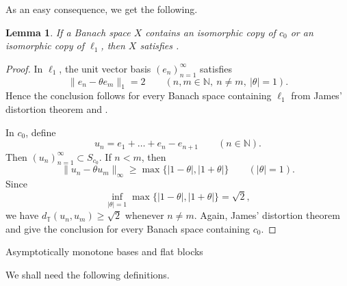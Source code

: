\documentclass[11pt,reqno]{amsart}
\makeatletter
\theoremstyle{plain}
\newtheorem{lemma}[lemma]{Lemma}
\theoremstyle{definition}
\newcommand{\N}{\mathbb N}
\newcommand{\distT}{d_{\mathbb T}}
\newcounter{problempaper}
\newenvironment{problempaperbody}{%
  \setcounter{subsection}{0}%
  \setcounter{subsubsection}{0}%
  \setcounter{paragraph}{0}%
  \renewcommand{\thesubsection}{\arabic{subsection}}%
  \renewcommand{\thesubsubsection}{\thesubsection.\arabic{subsubsection}}%
  \renewcommand{\theparagraph}{\thesubsubsection.\arabic{paragraph}}%
  \let\problem@outersection\section
  \let\problem@outersubsection\subsection
  \let\problem@outersubsubsection\subsubsection
  \let\problem@outerparagraph\paragraph
  \let\section\problem@papersection
  \let\subsection\problem@papersubsection
  \let\subsubsection\problem@papersubsubsection
}{%
  \let\section\problem@outersection
  \let\subsection\problem@outersubsection
  \let\subsubsection\problem@outersubsubsection
  \let\paragraph\problem@outerparagraph
}
\newcommand{\problem@target}[2]{%
  \hypertarget{problem-\theproblempaper-#1-#2}{}%
}
\newcommand{\problem@paperheading}[3]{%
  \par\bigskip
  \problem@target{#1}{#2}%
  \noindent{\large\bfseries #2.\quad #3\par}%
  \nobreak\smallskip
}
\newcommand{\problem@papersubheading}[3]{%
  \par\medskip
  \problem@target{#1}{#2}%
  \noindent{\normalsize\bfseries #2.\quad #3\par}%
  \nobreak\smallskip
}
\newcommand{\problem@papersubsubheading}[3]{%
  \par\smallskip
  \problem@target{#1}{#2}%
  \noindent{\normalsize\itshape #2.\quad #3.\ }%
}
\def\problem@papersection{%
  \@ifstar{\problem@papersectionstar}{\problem@papersectionnostar}%
}
\def\problem@papersectionstar#1{%
  \par\bigskip\noindent{\large\bfseries #1\par}\nobreak\smallskip
}
\def\problem@papersectionnostar#1{%
  \refstepcounter{subsection}%
  \setcounter{subsubsection}{0}%
  \setcounter{paragraph}{0}%
  \problem@paperheading{section}{\thesubsection}{#1}%
  \problem@writecontentsline{section}{\thesubsection}{#1}%
}
\def\problem@papersubsection{%
  \@ifstar{\problem@papersubsectionstar}{\problem@papersubsectionnostar}%
}
\def\problem@papersubsectionstar#1{%
  \par\medskip\noindent{\normalsize\bfseries #1\par}\nobreak\smallskip
}
\def\problem@papersubsectionnostar#1{%
  \refstepcounter{subsubsection}%
  \setcounter{paragraph}{0}%
  \problem@papersubheading{subsection}{\thesubsubsection}{#1}%
  \problem@writecontentsline{subsection}{\thesubsubsection}{#1}%
}
\def\problem@papersubsubsection{%
  \@ifstar{\problem@papersubsubsectionstar}{\problem@papersubsubsectionnostar}%
}
\def\problem@papersubsubsectionstar#1{%
  \par\smallskip\noindent{\normalsize\itshape #1.\ }%
}
\def\problem@papersubsubsectionnostar#1{%
  \refstepcounter{paragraph}%
  \problem@papersubsubheading{subsubsection}{\theparagraph}{#1}%
  \problem@writecontentsline{subsubsection}{\theparagraph}{#1}%
}
\newcommand{\problem@writecontentsline}[3]{%
  \begingroup
  \protected@write\@auxout{}{%
    \string\problemcontentsentry{\theproblempaper}{#1}{#2}{#3}{\thepage}%
  }%
  \endgroup
}
\newcommand{\problemcontentsentry}[5]{%
  \@ifundefined{problemcontents@#1}{%
    \expandafter\gdef\csname problemcontents@#1\endcsname{}%
  }{}%
  \expandafter\g@addto@macro\csname problemcontents@#1\endcsname{%
    \problemcontentsline{#1}{#2}{#3}{#4}{#5}%
  }%
}
\newcommand{\problemcontentslink}[4]{%
  \hyperlink{problem-#1-#2-#3}{#4}%
}
\newcommand{\problemcontentsline}[5]{%
  \ifstrequal{#2}{section}{%
    \par\noindent
    \problemcontentslink{#1}{#2}{#3}{\makebox[2.5em][l]{#3}#4}%
    \nobreak\dotfill
    \problemcontentslink{#1}{#2}{#3}{#5}\par
  }{%
    \ifstrequal{#2}{subsection}{%
      \par\noindent\hspace*{1.5em}%
      \problemcontentslink{#1}{#2}{#3}{\makebox[3.5em][l]{#3}#4}%
      \nobreak\dotfill
      \problemcontentslink{#1}{#2}{#3}{#5}\par
    }{%
      \par\noindent\hspace*{3em}%
      \problemcontentslink{#1}{#2}{#3}{\makebox[4.5em][l]{#3}#4}%
      \nobreak\dotfill
      \problemcontentslink{#1}{#2}{#3}{#5}\par
    }%
  }%
}
\makeatother
\begin{document}
\begin{problempaperbody}
As an easy consequence, we get the following.

\begin{lemma}
\label{p1-first:lem:c0-l1}
If a Banach space $X$ contains an isomorphic copy of $c_0$ or an isomorphic copy of $\ell_1$, then $X$ satisfies .
\end{lemma}

\begin{proof}
In $\ell_1$, the unit vector basis $(e_n)_{n=1}^{\infty}$ satisfies
\begin{equation*}
        \|e_n-\theta e_m\|_1=2 \qquad(n,m\in\N,\ n\ne m,\ |\theta|=1).
\end{equation*}
Hence the conclusion follows for every Banach space containing $\ell_1$ from James' distortion theorem \cite{James1964} and .

In $c_0$, define
\begin{equation*}
        u_n=e_1+\ldots+e_n-e_{n+1} \qquad(n\in\N).
\end{equation*}
Then $(u_n)_{n=1}^{\infty}\subset S_{c_0}$. If $n<m$, then
\begin{equation*}
        \|u_n-\theta u_m\|_\infty\geq \max\{|1-\theta|,|1+\theta|\} \qquad(|\theta|=1).
\end{equation*}
Since
\begin{equation*}
        \inf_{|\theta|=1}\max\{|1-\theta|,|1+\theta|\}=\sqrt2,
\end{equation*}
we have $\distT(u_n,u_m)\geq\sqrt2$ whenever $n\ne m$. Again, James' distortion theorem \cite{James1964} and  give the conclusion for every Banach space containing $c_0$.
\end{proof}

\section{Asymptotically monotone bases and flat blocks}\label{p1-first:sec:flat-block-alternative}

We shall need the following definitions.


\end{problempaperbody}
\end{document}
